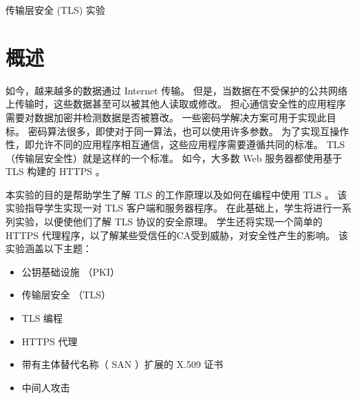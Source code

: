 

\newcommand{\commonfolder}{../../common-files}





\newcommand{\tlsFigs}{./Figs}


\newcommand{\hostu}{{\tt U}\xspace}
\newcommand{\hostv}{{\tt V}\xspace}




\begin{center}
{\LARGE 传输层安全 (TLS) 实验}
\end{center}




\section{概述}

如今，越来越多的数据通过 Internet 传输。
但是，当数据在不受保护的公共网络上传输时，这些数据甚至可以被其他人读取或修改。
担心通信安全性的应用程序需要对数据加密并检测数据是否被篡改。
一些密码学解决方案可用于实现此目标。
密码算法很多，即使对于同一算法，也可以使用许多参数。
为了实现互操作性，即允许不同的应用程序相互通信，这些应用程序需要遵循共同的标准。
TLS （传输层安全性）就是这样的一个标准。
如今，大多数 Web 服务器都使用基于 TLS 构建的 HTTPS 。

本实验的目的是帮助学生了解 TLS 的工作原理以及如何在编程中使用 TLS 。
该实验指导学生实现一对 TLS 客户端和服务器程序。
在此基础上，学生将进行一系列实验，以便使他们了解 TLS 协议的安全原理。
学生还将实现一个简单的 HTTPS 代理程序，以了解某些受信任的CA受到威胁，对安全性产生的影响。
该实验涵盖以下主题：


\begin{itemize}[noitemsep]
\item 公钥基础设施 （PKI）
\item 传输层安全 （TLS）
\item TLS 编程
\item HTTPS 代理
\item 带有主体替代名称（ SAN ）扩展的 X.509 证书
\item 中间人攻击
\end{itemize}



